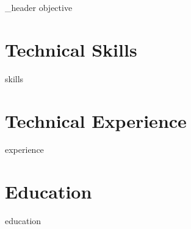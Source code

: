 \documentclass[letter,10pt]{article}
\author{Jorge Verástegui} %
\begin{document}
	{_header}
	{objective}
	
	\section{Technical Skills}
	{skills}
	
	\section{Technical Experience}
	{experience}
	
	\section{Education}
	{education}
	
	
	
	
\end{document}

